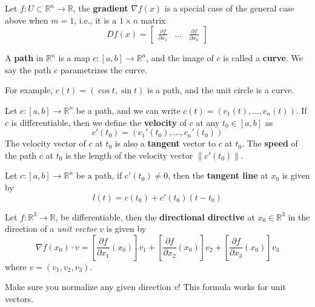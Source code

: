 \documentclass[openany]{book}
\newcommand{\R}{\mathbb{R}}
\begin{document}
\begin{defn}[graident]
    Let $f:U\subset\R^n\to\R$, the \textbf{gradient} $\nabla f(x)$ is a special case of the general case above when $m=1$, i.e., it is a $1\times n$ matrix 
    \begin{equation*}
        Df(x)=\begin{bmatrix}
            \frac{\partial f}{\partial x_1}&\dots&\frac{\partial f}{\partial x_n}
        \end{bmatrix}
    \end{equation*}
\end{defn}


\begin{defn}
    A \textbf{path} in $\R^n$ is a map $c:[a,b]\to\R^n$, and the image of $c$ is called a \textbf{curve}. We say the path $c$ parametrizes the curve. 

    \noindent For example, $c(t)=(\cos t, \sin t)$ is a path, and the unit circle is a curve.
\end{defn}


\begin{defn}
    Let $c:[a,b]\to\R^n$ be a path, and we can write $c(t)=(c_1(t), \dots, c_n(t))$. If $c$ is differentiable, then we define the \textbf{velocity} of $c$ at any $t_0\in [a,b]$ as 
    \begin{equation*}
        c'(t_0)=\left(c_1'(t_0), \dots, c_n'(t_0)\right)
    \end{equation*}
    The velocity vector of $c$ at $t_0$ is also a \textbf{tangent} vector to $c$ at $t_0$. The \textbf{speed} of the path $c$ at $t_0$ is the length of the velocity vector $\|c'(t_0)\|$.
\end{defn}

\begin{defn}\label{tangent path}
    Let $c:[a,b]\to\R^n$ be a path, if $c'(t_0)\neq 0$, then the \textbf{tangent line} at $x_0$ is given by 
    \begin{equation*}
        l(t)=c(t_0)+c'(t_0)(t-t_0)
    \end{equation*}
\end{defn}




\begin{defn}
    Let $f:\R^3\to\R$, be differentiable, then the \textbf{directional directive} at $x_0\in\R^3$ in the direction of a \textit{unit vector} $v$ is given by 
    \begin{equation*}
        \nabla f(x_0)\cdot v=\left[\frac{\partial f}{\partial x_1}(x_0)\right]v_1+\left[\frac{\partial f}{\partial x_2}(x_0)\right]v_2+\left[\frac{\partial f}{\partial x_3}(x_0)\right]v_3
    \end{equation*}
    where $v=(v_1,v_2,v_3)$.
\end{defn}
\begin{warn}
    Make sure you normalize any given direction $v$! This formula works for unit vectors.
\end{warn}
\end{document}
